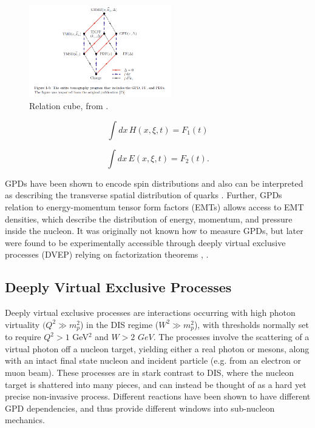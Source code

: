             \begin{figure}[H]
                \centering
                \includegraphics[width=0.55\textwidth,trim={3cm 1.5cm 3cm 0},clip]{Chapters/Ch1-Intro/Ch1-Sec2-GPDs-DVMP/pics/gtmd-cube-sangbaek.png}
                \caption[Distribution Relationship Cube]{Relation cube, from \parencite{Burkardt2016ModellingStructure}. }
                \label{fig:gmtd_cube}
            \end{figure}
        
        \begin{equation}\label{gpd_f1}
        \int dx \, H(x, \xi, t) = F_1(t)
        \end{equation}
        
        \begin{equation}\label{gpd_f2}
        \int dx \, E(x, \xi, t) = F_2(t). 
        \end{equation}


        GPDs have been shown \parencite{Ji1997Gauge-InvariantSpin} to encode spin distributions and also can be interpreted as describing the transverse spatial distribution of quarks \parencite{Burkardt2007GPDs0}. Further, GPDs relation to energy-momentum tensor form factors (EMTs) allows access to EMT densities, which describe the distribution of energy, momentum, and pressure inside the nucleon. It was originally not known how to measure GPDs, but later were found to be experimentally accessible through deeply virtual exclusive processes (DVEP) relying on factorization theorems \parencite{Collins1999ProofQCD}, \parencite{Bauer2002HardTheory}. 
           
    
    
    \subsection{Deeply Virtual Exclusive Processes}

        Deeply virtual exclusive processes are interactions occurring with high photon virtuality $(Q^2  \gg  m_p^2$) in the DIS regime ($W^2 \gg m_p^2$), with thresholds normally set to require  $Q^2 > 1$ GeV$^2$ and $W>2$ $GeV$. The processes involve the scattering of a virtual photon off a nucleon target, yielding either a real photon or mesons, along with an intact final state nucleon and incident particle (e.g. from an electron or muon beam). These processes are in stark contrast to DIS, where the nucleon target is shattered into many pieces, and can instead be thought of as a hard yet precise non-invasive process. Different reactions have been shown to have different GPD dependencies, and thus provide different windows into sub-nucleon mechanics. 

